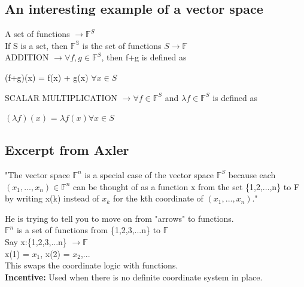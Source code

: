 \documentclass{article}
\begin{document}
\subsection{An interesting example of a vector space}
A set of functions $\rightarrow \mathbb{F}^S$ \\
If S is a set, then $\mathbb{F^S}$ is the set of functions $S \rightarrow \mathbb{F}$ \\
ADDITION $\rightarrow \forall f,g\in \mathbb{F}^S$, then f+g is defined as 
\begin{center}
    (f+g)(x) = f(x) + g(x) $\forall x \in S$
\end{center}
SCALAR MULTIPLICATION $\rightarrow \forall f\in \mathbb{F}^S$ and $\lambda f \in \mathbb{F}^S$ is defined as 
\begin{center}
    $(\lambda f)(x)$ = $\lambda f(x) \forall x\in S$
\end{center}
\subsection{Excerpt from Axler}
\begin{center}
    "The vector space $\mathbb{F}^n$ is a special case of the vector space $\mathbb{F}^S$ because each $(x_1, ..., x_n) \in \mathbb{F}^n$ can be thought of as a function x from the set \{1,2,...,n\} to F by writing x(k) instead of $x_k$ for the kth coordinate of $(x_1, ..., x_n)$."
\end{center}
He is trying to tell you to move on from "arrows" to functions. \\
$\mathbb{F}^n$ is a set of functions from \{1,2,3,...n\} to $\mathbb{F}$ \\
Say x:\{1,2,3,...n\} $\rightarrow \mathbb{F}$ \\
x(1) = $x_1$, x(2) = $x_2$,... \\ 
This swaps the coordinate logic with functions. \\
\textbf{Incentive:} Used when there is no definite coordinate system in place.
\end{document}
